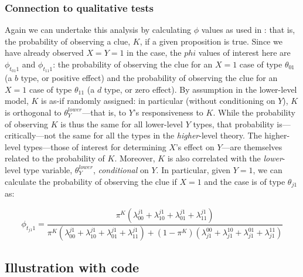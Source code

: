 \documentclass[12pt,]{book}
\begin{document}
\hypertarget{connection-to-qualitative-tests-1}{%
\subsubsection{Connection to qualitative tests}\label{connection-to-qualitative-tests-1}}

Again we can undertake this analysis by calculating \(\phi\) values as used in \citet{humphreys2015mixing}: that is, the probability of observing a clue, \(K\), if a given proposition is true. Since we have already observed \(X=Y=1\) in the case, the \(phi\) values of interest here are \(\phi_{t_{01}1}\) and \(\phi_{t_{11}1}\): the probability of observing the clue for an \(X=1\) case of type \(\theta_{01}\) (a \(b\) type, or positive effect) and the probability of observing the clue for an \(X=1\) case of type \(\theta_{11}\) (a \(d\) type, or zero effect). By assumption in the lower-level model, \(K\) is as-if randomly assigned: in particular (without conditioning on \(Y\)), \(K\) is orthogonal to \(\theta_Y^{lower}\)---that is, to \(Y\)'s responsiveness to \(K\). While the probability of observing \(K\) is thus the same for all lower-level \(Y\) types, that probability is---critically---not the same for all the types in the \emph{higher}-level theory. The higher-level types---those of interest for determining \(X\)'s effect on \(Y\)---are themselves related to the probability of \(K\). Moreover, \(K\) is also correlated with the \emph{lower}-level type variable, \(\theta_Y^{lower}\), \emph{conditional} on \(Y\). In particular, given \(Y=1\), we can calculate the probability of observing the clue if \(X=1\) and the case is of type \(\theta_{j1}\) as:

\[\phi_{t_{j1}1} = \frac{\pi^K\left(\lambda_{00}^{j1}+\lambda_{10}^{j1}+\lambda_{01}^{j1}+\lambda_{11}^{j1}\right)}{\pi^K\left(\lambda_{00}^{j1}+\lambda_{10}^{j1}+\lambda_{01}^{j1}+\lambda_{11}^{j1}\right)
+
(1-\pi^K)\left(\lambda_{j1}^{00}+\lambda_{j1}^{10}+\lambda_{j1}^{01}+\lambda_{j1}^{11}\right)}\]

\hypertarget{illustration-with-code}{%
\subsection{Illustration with code}\label{illustration-with-code}}
\end{document}
